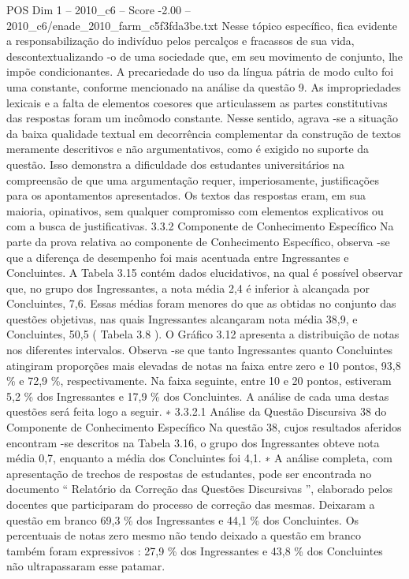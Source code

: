 \begin{textsample}{POS Dim 1 – 2010\_c6 – Score -2.00 – 2010\_c6/enade\_2010\_farm\_c5f3fda3be.txt}
Nesse tópico específico, fica evidente a responsabilização do indivíduo pelos percalços e fracassos de sua vida, descontextualizando -o de uma sociedade que, em seu movimento de conjunto, lhe impõe condicionantes.
A precariedade do uso da língua pátria de modo culto foi uma constante, conforme mencionado na análise da questão 9.
As impropriedades lexicais e a falta de elementos coesores que articulassem as partes constitutivas das respostas foram um incômodo constante.
Nesse sentido, agrava -se a situação da baixa qualidade textual em decorrência complementar da construção de textos meramente descritivos e não argumentativos, como é exigido no suporte da questão.
Isso demonstra a dificuldade dos estudantes universitários na compreensão de que uma argumentação requer, imperiosamente, justificações para os apontamentos apresentados.
Os textos das respostas eram, em sua maioria, opinativos, sem qualquer compromisso com elementos explicativos ou com a busca de justificativas. 3.3.2 Componente de Conhecimento Específico Na parte da prova relativa ao componente de Conhecimento Específico, observa -se que a diferença de desempenho foi mais acentuada entre Ingressantes e Concluintes.
A Tabela 3.15 contém dados elucidativos, na qual é possível observar que, no grupo dos Ingressantes, a nota média 2,4 é inferior à alcançada por Concluintes, 7,6.
Essas médias foram menores do que as obtidas no conjunto das questões objetivas, nas quais Ingressantes alcançaram nota média 38,9, e Concluintes, 50,5 ( Tabela 3.8 ).
O Gráfico 3.12 apresenta a distribuição de notas nos diferentes intervalos.
Observa -se que tanto Ingressantes quanto Concluintes atingiram proporções mais elevadas de notas na faixa entre zero e 10 pontos, 93,8 \% e 72,9 \%, respectivamente.
Na faixa seguinte, entre 10 e 20 pontos, estiveram 5,2 \% dos Ingressantes e 17,9 \% dos Concluintes.
A análise de cada uma destas questões será feita logo a seguir. ∗ 3.3.2.1 Análise da Questão Discursiva 38 do Componente de Conhecimento Específico Na questão 38, cujos resultados aferidos encontram -se descritos na Tabela 3.16, o grupo dos Ingressantes obteve nota média 0,7, enquanto a média dos Concluintes foi 4,1. ∗ A análise completa, com apresentação de trechos de respostas de estudantes, pode ser encontrada no documento “ Relatório da Correção das Questões Discursivas ”, elaborado pelos docentes que participaram do processo de correção das mesmas.
Deixaram a questão em branco 69,3 \% dos Ingressantes e 44,1 \% dos Concluintes.
Os percentuais de notas zero mesmo não tendo deixado a questão em branco também foram expressivos : 27,9 \% dos Ingressantes e 43,8 \% dos Concluintes não ultrapassaram esse patamar.

\end{textsample}
